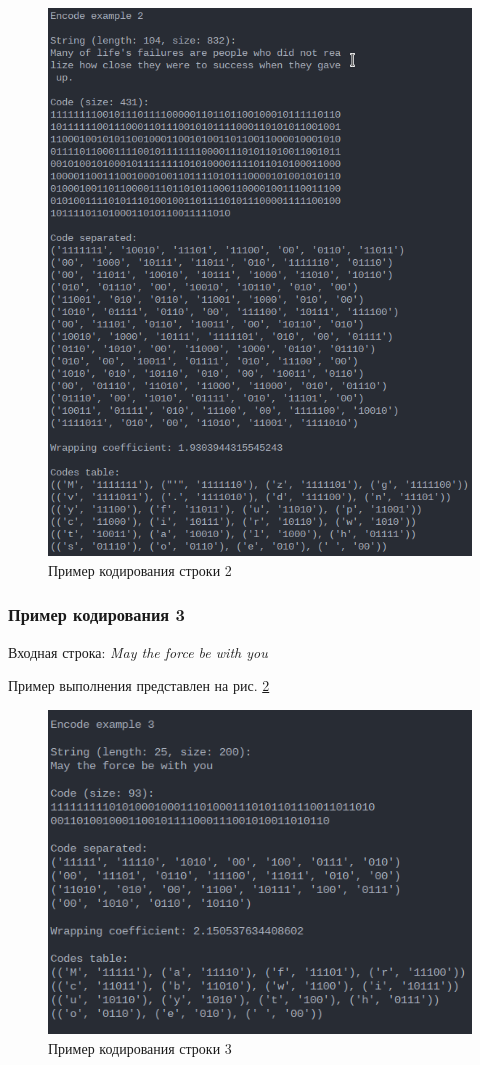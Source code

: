 \begin{figure}[H]
    \centering
    \includegraphics[width=0.7\linewidth]{photo/encode_example_2}
    \caption{Пример кодирования строки 2}
    \label{fig:encode_example_2}
\end{figure}

\subsubsection*{Пример кодирования 3}

Входная строка: \textit{May the force be with you}

Пример выполнения представлен на рис. \ref{fig:encode_example_3}

\begin{figure}[H]
    \centering
    \includegraphics[width=0.7\linewidth]{photo/encode_example_3}
    \caption{Пример кодирования строки 3}
    \label{fig:encode_example_3}
\end{figure}


